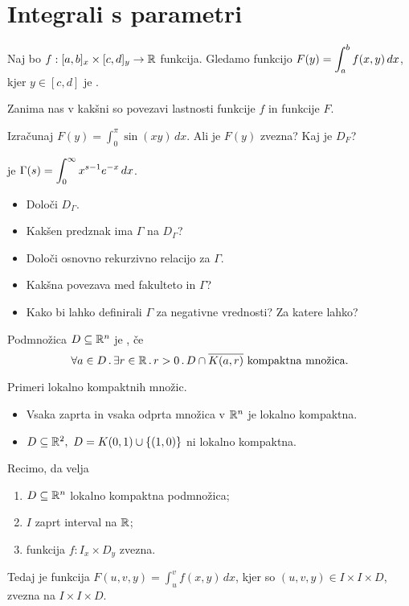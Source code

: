 \section{Integrali s parametri}
Naj bo $f:[a,b]_x \times [c,d]_y \to \mathbb{R}$ funkcija. Gledamo funkcijo $\displaystyle F(y) = \int_{a}^{b}f(x,y) \, dx$, kjer $y \in [c,d]$ je .

Zanima nas v kakšni so povezavi lastnosti funkcije $f$ in funkcije $F$.

\begin{zgled}
    Izračunaj $F(y) = \int_{0}^{\pi} \sin (xy) \,dx$. Ali je $F(y)$ zvezna? Kaj je $D_F$?
\end{zgled}

\begin{zgled}
     je $\displaystyle \Gamma (s) = \int_{0}^{\infty} x^{s-1} e^{-x} \, dx$.
    \begin{itemize}
        \item Določi $D_\Gamma$.
        \item Kakšen predznak ima $\Gamma$ na $D_\Gamma$?
        \item Določi osnovno rekurzivno relacijo za $\Gamma$.
        \item Kakšna povezava med fakulteto in $\Gamma$?
        \item Kako bi lahko definirali $\Gamma$ za negativne vrednosti? Za katere lahko?
    \end{itemize}
\end{zgled}

\begin{definicija}
    Podmnožica $D \subseteq \mathbb{R}^n$ je , če
    $$\forall a \in D \,.\, \exists r \in \mathbb{R} \, . \, r > 0 \,.\, D \cap \overline{K(a,r)} \text{ kompaktna množica}.$$
\end{definicija}

\begin{zgled}
    Primeri lokalno kompaktnih množic.
    \begin{itemize}
        \item Vsaka zaprta in vsaka odprta množica v $\mathbb{R}^n$ je lokalno kompaktna.
        \item $D \subseteq \mathbb{R}^2, \ D = K(0,1) \cup \left\{(1,0)\right\}$ ni lokalno kompaktna.
    \end{itemize}
\end{zgled}

\begin{trditev}
    Recimo, da velja
    \begin{enumerate}
        \item $D \subseteq \mathbb{R}^n$ lokalno kompaktna podmnožica;
        \item $I$ zaprt interval na $\mathbb{R}$;
        \item funkcija $f: I_x \times D_y$ zvezna.
    \end{enumerate}
    Tedaj je funkcija $\displaystyle F(u, v, y) = \int_{u}^{v}f(x,y) \, dx$, kjer so $(u, v, y) \in I \times I \times D$, zvezna na $I \times I \times D$.
\end{trditev}

